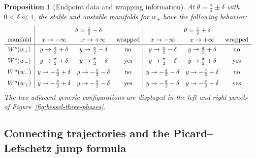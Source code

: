 \documentclass[11pt]{amsart}
\theoremstyle{plain}
\newtheorem{prop}[thm]{Proposition}
\begin{document}
\begin{prop}[Endpoint data and wrapping information]
\label{prop:bessel-endpoint-data}
At \(\theta=\frac{\pi}{2}\pm\delta\) with \(0<\delta\ll 1\), the stable and unstable manifolds for \(w_\pm\) have the following behavior:
\[
\renewcommand{\arraystretch}{1.25}
\begin{array}{c|ccc|ccc}
& \multicolumn{3}{c|}{\theta=\frac{\pi}{2}-\delta}
& \multicolumn{3}{c}{\theta=\frac{\pi}{2}+\delta} \\
\text{manifold}
& x\to-\infty & x\to+\infty & \text{wrapped}
& x\to-\infty & x\to+\infty & \text{wrapped}
\\ \hline
W^s(w_+)
& y\to \frac{\pi}{2}+\delta
& y\to \frac{\pi}{2}-\delta
& \text{no}
& y\to \frac{\pi}{2}-\delta
& y\to \frac{\pi}{2}+\delta
& \text{no}
\\[1mm]
W^s(w_-)
& y\to \frac{\pi}{2}+\delta
& y\to \frac{\pi}{2}-\delta
& \text{yes}
& y\to \frac{\pi}{2}-\delta
& y\to \frac{\pi}{2}+\delta
& \text{yes}
\\[1mm]
W^u(w_-)
& y\to -\frac{\pi}{2}+\delta
& y\to -\frac{\pi}{2}-\delta
& \text{no}
& y\to -\frac{\pi}{2}-\delta
& y\to -\frac{\pi}{2}+\delta
& \text{no}
\\[1mm]
W^u(w_+)
& y\to -\frac{\pi}{2}+\delta
& y\to -\frac{\pi}{2}-\delta
& \text{yes}
& y\to -\frac{\pi}{2}-\delta
& y\to -\frac{\pi}{2}+\delta
& \text{yes}
\end{array}
\]
The two adjacent generic configurations are displayed in the left and right panels of Figure~\ref{fig:bessel-three-phases}.
\end{prop}

\smallskip
\subsection{Connecting trajectories and the Picard--Lefschetz jump formula}
\label{sec:BesselLef}
\end{document}
